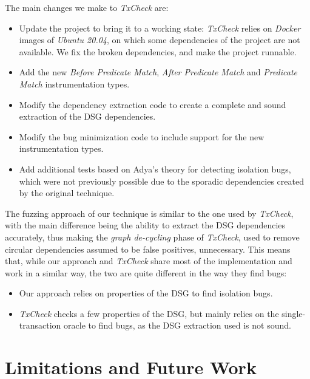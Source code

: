 The main changes we make to \textit{TxCheck} are:
\begin{itemize}
    \item Update the project to bring it to a working state: \textit{TxCheck} relies on \textit{Docker} images of \textit{Ubuntu 20.04}, on which some dependencies of the project are not available. We fix the broken dependencies, and make the project runnable.
    \item Add the new \textit{Before Predicate Match}, \textit{After Predicate Match} and \textit{Predicate Match} instrumentation types.
    \item Modify the dependency extraction code to create a complete and sound extraction of the DSG dependencies.
    \item Modify the bug minimization code to include support for the new instrumentation types.
    \item Add additional tests based on Adya's theory \cite{adya1999weak} for detecting isolation bugs, which were not previously possible due to the sporadic dependencies created by the original technique.
\end{itemize}

The fuzzing approach of our technique is similar to the one used by \textit{TxCheck}, with the main difference being the ability to extract the DSG dependencies accurately, thus making the \textit{graph de-cycling} phase of \textit{TxCheck}, used to remove circular dependencies assumed to be false positives, unnecessary. This means that, while our approach and \textit{TxCheck} share most of the implementation and work in a similar way, the two are quite different in the way they find bugs:
\begin{itemize}
    \item Our approach relies on properties of the DSG to find isolation bugs.
    \item \textit{TxCheck} checks a few properties of the DSG, but mainly relies on the single-transaction oracle to find bugs, as the DSG extraction used is not sound.
\end{itemize}

\section{Limitations and Future Work}


